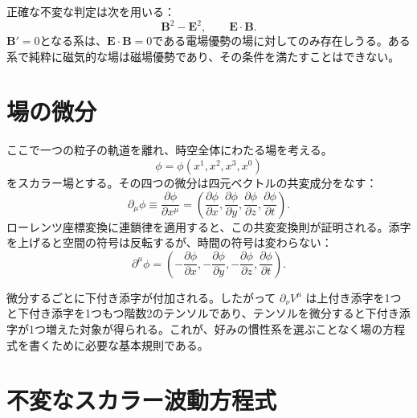 正確な不変な判定は次を用いる：
\begin{equation}
  \boldsymbol B^2-\boldsymbol E^2,
  \qquad
  \boldsymbol E\cdot\boldsymbol B.
\end{equation}
\(\boldsymbol B'=0\)となる系は、\(\boldsymbol E\cdot\boldsymbol B=0\)である電場優勢の場に対してのみ存在しうる。ある系で純粋に磁気的な場は磁場優勢であり、その条件を満たすことはできない。

\begin{classroomqa}
\end{classroomqa}

\section{場の微分}

ここで一つの粒子の軌道を離れ、時空全体にわたる場を考える。
\begin{equation}
  \phi=\phi(x^1,x^2,x^3,x^0)
\end{equation}
をスカラー場とする。その四つの微分は四元ベクトルの共変成分をなす：
\begin{equation}
  \partial_\mu\phi
  \equiv\frac{\partial\phi}{\partial x^\mu}
  =\left(
    \frac{\partial\phi}{\partial x},
    \frac{\partial\phi}{\partial y},
    \frac{\partial\phi}{\partial z},
    \frac{\partial\phi}{\partial t}
  \right).
\end{equation}
ローレンツ座標変換に連鎖律を適用すると、この共変変換則が証明される。添字を上げると空間の符号は反転するが、時間の符号は変わらない：
\begin{equation}
  \partial^\mu\phi
  =\left(
    -\frac{\partial\phi}{\partial x},
    -\frac{\partial\phi}{\partial y},
    -\frac{\partial\phi}{\partial z},
    \frac{\partial\phi}{\partial t}
  \right).
\end{equation}

微分するごとに下付き添字が付加される。したがって
\(\partial_\nu V^\mu\) は上付き添字を1つと下付き添字を1つもつ階数2のテンソルであり、テンソルを微分すると下付き添字が1つ増えた対象が得られる。これが、好みの慣性系を選ぶことなく場の方程式を書くために必要な基本規則である。

\section{不変なスカラー波動方程式}

